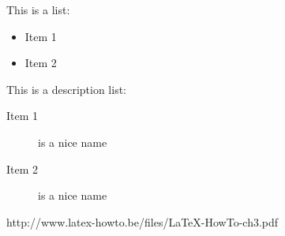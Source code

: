 \begin{Results}
This is a list:
\begin{itemize}
\item Item 1
\item Item 2
\end{itemize}

This is a description list:
\begin{description}
\item[Item 1] is a nice name
\item[Item 2] is a nice name
\end{description}
\end{Results}

\pagebreak

\begin{References}
http://www.latex-howto.be/files/LaTeX-HowTo-ch3.pdf
\end{References}
